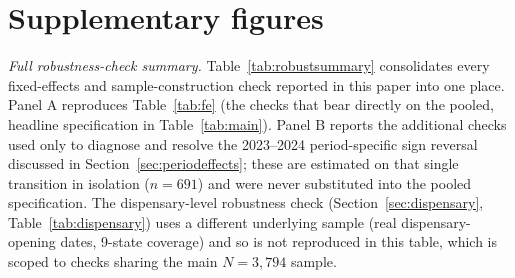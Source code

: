 \documentclass[12pt]{article}
\begin{document}
\appendix
\section{Supplementary figures}
\label{sec:appendix}

\noindent\emph{Full robustness-check summary.} Table~\ref{tab:robustsummary}
consolidates every fixed-effects and sample-construction check reported
in this paper into one place. Panel A reproduces Table~\ref{tab:fe}
(the checks that bear directly on the pooled, headline specification
in Table~\ref{tab:main}). Panel B reports the additional checks used
only to diagnose and resolve the 2023--2024 period-specific sign
reversal discussed in Section~\ref{sec:periodeffects}; these are
estimated on that single transition in isolation ($n=691$) and were
never substituted into the pooled specification. The dispensary-level
robustness check (Section~\ref{sec:dispensary}, Table~\ref{tab:dispensary})
uses a different underlying sample (real dispensary-opening dates,
9-state coverage) and so is not reproduced in this table, which is
scoped to checks sharing the main $N=3{,}794$ sample.
\end{document}
